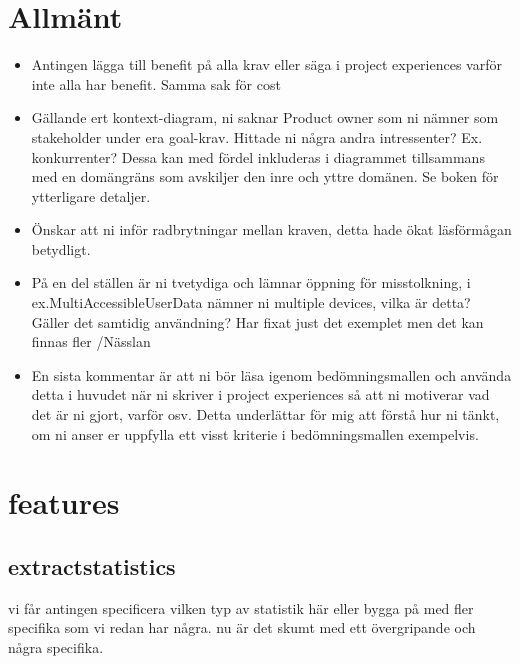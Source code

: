 \documentclass[a4paper]{article}
\begin{document}
	\thispagestyle{empty}
	\setcounter{page}{0}
	\pagebreak
	\tableofcontents
	\pagebreak

\section{Allmänt}
\begin{itemize}

	\item Antingen lägga till benefit på alla krav eller säga i project experiences varför inte alla har benefit. Samma sak för cost
	
	\item Gällande ert kontext-diagram, ni saknar Product owner som ni nämner som stakeholder under era goal-krav. Hittade ni några andra intressenter? Ex. konkurrenter? Dessa kan med fördel inkluderas i diagrammet tillsammans med en domängräns som avskiljer den inre och yttre domänen. Se boken för ytterligare detaljer.
	
	
	
	\item Önskar att ni inför radbrytningar mellan kraven, detta hade ökat läsförmågan betydligt. %
	

	\item På en del ställen är ni tvetydiga och lämnar öppning för misstolkning, i ex.MultiAccessibleUserData nämner ni multiple devices, vilka är detta? Gäller det samtidig användning? Har fixat just det exemplet men det kan finnas fler /Nässlan
	
	
	\item En sista kommentar är att ni bör läsa igenom bedömningsmallen och använda detta i huvudet när ni skriver i project experiences så att ni motiverar vad det är ni gjort, varför osv. Detta underlättar för mig att förstå hur ni tänkt, om ni anser er uppfylla ett visst kriterie i bedömningsmallen exempelvis.
	
	
	
	
\end{itemize}


\section{features}

		
	\subsection{extractstatistics}
vi får antingen specificera vilken typ av statistik  här eller bygga på med  fler specifika som vi redan har några. nu är det skumt med ett övergripande och några specifika.
	
\end{document}
